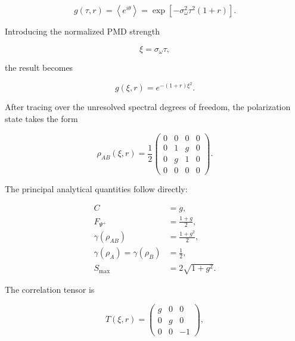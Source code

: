 \begin{equation}
g(\tau,r)
=
\left\langle
e^{i\theta}
\right\rangle
=
\exp
\left[
-\sigma_\omega^2\tau^2(1+r)
\right].
\label{eq:exp2_coherence}
\end{equation}

Introducing the normalized PMD strength

\begin{equation}
\xi=\sigma_\omega\tau,
\label{eq:exp2_xi}
\end{equation}

the result becomes

\begin{equation}
\boxed{
g(\xi,r)
=
e^{-(1+r)\xi^2}
}.
\label{eq:exp2_coherence_normalized}
\end{equation}

After tracing over the unresolved spectral degrees of freedom, the polarization state
takes the form

\begin{equation}
\rho_{AB}(\xi,r)
=
\frac{1}{2}
\begin{pmatrix}
0 & 0 & 0 & 0
\\
0 & 1 & g & 0
\\
0 & g & 1 & 0
\\
0 & 0 & 0 & 0
\end{pmatrix}.
\label{eq:exp2_reduced_polarization_state}
\end{equation}

The principal analytical quantities follow directly:

\begin{align}
C
&=
g,
\\
F_{\Psi^+}
&=
\frac{1+g}{2},
\\
\gamma(\rho_{AB})
&=
\frac{1+g^2}{2},
\\
\gamma(\rho_A)
=
\gamma(\rho_B)
&=
\frac{1}{2},
\\
S_{\max}
&=
2\sqrt{1+g^2}.
\label{eq:exp2_analytical_metrics}
\end{align}

The correlation tensor is

\begin{equation}
T(\xi,r)
=
\begin{pmatrix}
g & 0 & 0
\\
0 & g & 0
\\
0 & 0 & -1
\end{pmatrix},
\label{eq:exp2_correlation_tensor}
\end{equation}

